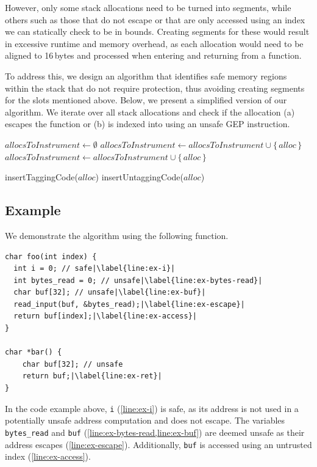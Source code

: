 However, only some stack allocations need to be turned into segments, while others such as those that do not escape or that are only accessed using an index we can statically check to be in bounds.
Creating segments for these would result in excessive runtime and memory overhead, as each allocation would need to be aligned to 16\,bytes and processed when entering and returning from a function.

To address this, we design an algorithm that identifies safe memory regions within the stack that do not require protection, thus avoiding creating segments for the slots mentioned above.
Below, we present a simplified version of our algorithm.
We iterate over all stack allocations and check if the allocation (a) escapes the function or (b) is indexed into using an unsafe \ac{GEP} instruction.

\begin{algorithmic}
    \State $allocsToInstrument \gets \emptyset$
            \State $allocsToInstrument \gets allocsToInstrument \cup \{\,alloc\,\}$
        \State $allocsToInstrument \gets allocsToInstrument \cup \{\,alloc\,\}$
        \EndIf
    \EndFor

        \State insertTaggingCode($alloc$)
        \State insertUntaggingCode($alloc$)
    \EndFor
\end{algorithmic}

\subsection{Example}
\label{subsec:example2}

We demonstrate the algorithm using the following function.

\begin{lstlisting}[frame=h,style=customc,
    label={lst:stack-safety},escapechar=|]
char foo(int index) {
  int i = 0; // safe|\label{line:ex-i}|
  int bytes_read = 0; // unsafe|\label{line:ex-bytes-read}|
  char buf[32]; // unsafe|\label{line:ex-buf}|
  read_input(buf, &bytes_read);|\label{line:ex-escape}|
  return buf[index];|\label{line:ex-access}|
}

char *bar() {
    char buf[32]; // unsafe
    return buf;|\label{line:ex-ret}|
}
\end{lstlisting}

In the code example above, \texttt{i} (\cref{line:ex-i}) is safe, as its address is not used in a potentially unsafe address computation and does not escape.
The variables \texttt{bytes\_read} and \texttt{buf} (\cref{line:ex-bytes-read,line:ex-buf}) are deemed unsafe as their address escapes (\cref{line:ex-escape}).
Additionally, \texttt{buf} is accessed using an untrusted index (\cref{line:ex-access}).

